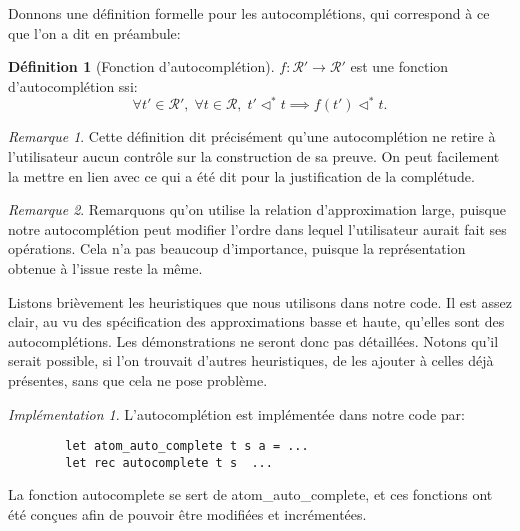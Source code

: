 \documentclass[11pt,a4paper]{article}
\theoremstyle{plain}
\theoremstyle{definition}
\newtheorem{definition}{Définition}
\theoremstyle{remark}
\newtheorem{remark}{Remarque}
\newtheorem{implementation}{Implémentation}
\newcommand*{\representations}{\ensuremath{\mathcal{R}}}
\newcommand*{\representationspartial}{\ensuremath{\mathcal{R'}}}
\newcommand*{\relapprox}{\ensuremath{\triangleleft}}
\newcommand*{\relapproxlarge}{\ensuremath{\relapprox^*}}
\begin{document}
Donnons une définition formelle pour les autocomplétions, qui correspond à ce que l'on a dit en préambule:

\begin{definition}[Fonction d'autocomplétion]
$f: \representationspartial \rightarrow \representationspartial$ est une fonction d'autocomplétion ssi:
\begin{equation*}
    \forall t' \in \representationspartial, \; \forall t \in \representations, \; t' \relapproxlarge t \implies f(t') \relapproxlarge t.
\end{equation*}
\end{definition}

\begin{remark}
    Cette définition dit précisément qu'une autocomplétion ne retire à l'utilisateur aucun contrôle sur la construction de sa preuve. On peut facilement la mettre en lien avec ce qui a été dit pour la justification de la complétude. 
\end{remark}

\begin{remark}
    Remarquons qu'on utilise la relation d'approximation large, puisque notre autocomplétion peut modifier l'ordre dans lequel l'utilisateur aurait fait ses opérations. Cela n'a pas beaucoup d'importance, puisque la représentation obtenue à l'issue reste la même.
\end{remark}

Listons brièvement les heuristiques que nous utilisons dans notre code. Il est assez clair, au vu des spécification des approximations basse et haute, qu'elles sont des autocomplétions. Les démonstrations ne seront donc pas détaillées. Notons qu'il serait possible, si l'on trouvait d'autres heuristiques, de les ajouter à celles déjà présentes, sans que cela ne pose problème.

\begin{implementation}
    L'autocomplétion est implémentée dans notre code par:

    \begin{verbatim}
        let atom_auto_complete t s a = ...
        let rec autocomplete t s  ...
    \end{verbatim}
    
    La fonction autocomplete se sert de atom\_auto\_complete, et ces fonctions ont été conçues afin de pouvoir être modifiées et incrémentées.
\end{implementation}
\end{document}
